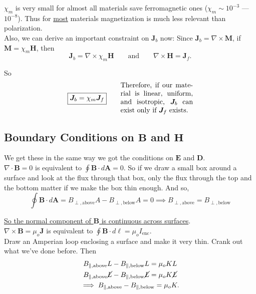 \documentclass{article}
\numberwithin{equation}{section}
\begin{document}
$\chi_m$ is very small for almost all materials save ferromagnetic ones ($\chi_m \sim 10^{-3}$ --- $10^{-8}$). Thus for \underline{most} materials magnetization is much less relevant than polarization. \\

Also, we can derive an important constraint on $\bm{J}_b$ now: Since $\bm{J}_b = \nabla \times \bm{M}$, if $\bm{M} = \chi_m \bm{H}$, then
\begin{equation*}
    \bm{J}_b = \nabla \times \chi_m \bm{H} \qquad \text{and} \qquad \nabla \times \bm{H} = \bm{J}_f.
\end{equation*}

So
\begin{equation*}
    \boxed{\bm{J}_b = \chi_m \bm{J}_f} \qquad \parbox[c]{0.3\linewidth}{Therefore, if our material is linear, uniform, and isotropic, $\bm{J}_b$ can exist only if $\bm{J}_f$ exists.}
\end{equation*}

\subsection*{Boundary Conditions on $\bm{B}$ and $\bm{H}$}

We get these in the same way we got the conditions on $\bm{E}$ and $\bm{D}$. \\

$\nabla \cdot \bm{B} = 0$ is equivalent to $\displaystyle \oint \bm{B} \cdot d\bm{A} = 0$. So if we draw a small box around a surface and look at the flux through that box, only the flux through the top and the bottom matter if we make the box thin enough. And so,
\begin{equation*}
    \oint \bm{B} \cdot d\bm{A} = B_{\perp, \text{above}} A - B_{\perp, \text{below}} A = 0 \implies \boxed{B_{\perp, \text{above}} = B_{\perp, \text{below}}}
\end{equation*}

\underline{So the normal component of $\bm{B}$ is continuous across surfaces}. \\

$\nabla \times \bm{B} = \mu_o \bm{J}$ is equivalent to $\displaystyle \oint \bm{B} \cdot d\bm{\ell} = \mu_o I_{\text{enc}}$. \\

Draw an Amperian loop enclosing a surface and make it very thin. Crank out what we've done before. Then
\begin{gather*}
    B_{\parallel, \text{above}} L - B_{\parallel, \text{below}} L = \mu_o K L \\
    B_{\parallel, \text{above}} \cancel{L} - B_{\parallel, \text{below}} \cancel{L} = \mu_o K \cancel{L} \\
    \implies B_{\parallel, \text{above}} - B_{\parallel, \text{below}} = \mu_o K.
\end{gather*}
\end{document}
